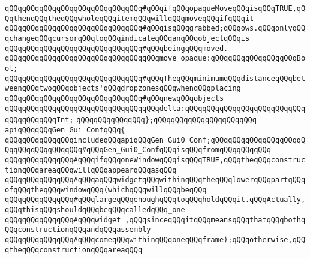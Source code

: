 \verb|qQQqqQQqqQQqqQQqqQQqqQQqqQQqqQQq#qQQqifqQQqopaqueMoveqQQqisqQQqTRUE,qQQqthenqQQqtheqQQqwholeqQQqitemqQQqwillqQQqmoveqQQqifqQQqit|\newline
\verb|qQQqqQQqqQQqqQQqqQQqqQQqqQQqqQQq#qQQqisqQQqgrabbed;qQQqows.qQQqonlyqQQqchangeqQQqcursorqQQqtoqQQqindicateqQQqanqQQqobjectqQQqis|\newline
\verb|qQQqqQQqqQQqqQQqqQQqqQQqqQQqqQQq#qQQqbeingqQQqmoved.|\newline
\verb|qQQqqQQqqQQqqQQqqQQqqQQqqQQqqQQqqQQqmove_opaque:qQQqqQQqqQQqqQQqqQQqBool;|\newline
\newline
\verb|qQQqqQQqqQQqqQQqqQQqqQQqqQQqqQQq#qQQqTheqQQqminimumqQQqdistanceqQQqbetweenqQQqtwoqQQqobjects'qQQqdropzonesqQQqwhenqQQqplacing|\newline
\verb|qQQqqQQqqQQqqQQqqQQqqQQqqQQqqQQq#qQQqnewqQQqobjects|\newline
\newline
\verb|qQQqqQQqqQQqqQQqqQQqqQQqqQQqqQQqqQQqdelta:qQQqqQQqqQQqqQQqqQQqqQQqqQQqqQQqqQQqqQQqInt;|\newline
\verb|qQQqqQQqqQQqqQQq};qQQqqQQqqQQqqQQqqQQqqQQq|\newline
\newline
\newline
\verb|apiqQQqqQQqGen_Gui_ConfqQQq{|\newline
\newline
\verb|qQQqqQQqqQQqqQQqincludeqQQqapiqQQqGen_Gui0_Conf;qQQqqQQqqQQqqQQqqQQqqQQqqQQqqQQqqQQqqQQq#qQQqGen_Gui0_ConfqQQqisqQQqfromqQQqqQQqqQQq|\newline
\newline
\verb|qQQqqQQqqQQqqQQq#qQQqifqQQqoneWindowqQQqisqQQqTRUE,qQQqtheqQQqconstructionqQQqareaqQQqwillqQQqappearqQQqasqQQq|\newline
\verb|qQQqqQQqqQQqqQQq#qQQqaqQQqwidgetqQQqwithinqQQqtheqQQqlowerqQQqpartqQQqofqQQqtheqQQqwindowqQQq(whichqQQqwillqQQqbeqQQq|\newline
\verb|qQQqqQQqqQQqqQQq#qQQqlargeqQQqenoughqQQqtoqQQqholdqQQqit.qQQqActually,qQQqthisqQQqshouldqQQqbeqQQqcalledqQQq_one|\newline
\verb|qQQqqQQqqQQqqQQq#qQQqwidget_,qQQqsinceqQQqitqQQqmeansqQQqthatqQQqbothqQQqconstructionqQQqandqQQqassembly|\newline
\verb|qQQqqQQqqQQqqQQq#qQQqcomeqQQqwithinqQQqoneqQQqframe);qQQqotherwise,qQQqtheqQQqconstructionqQQqareaqQQq|\newline
